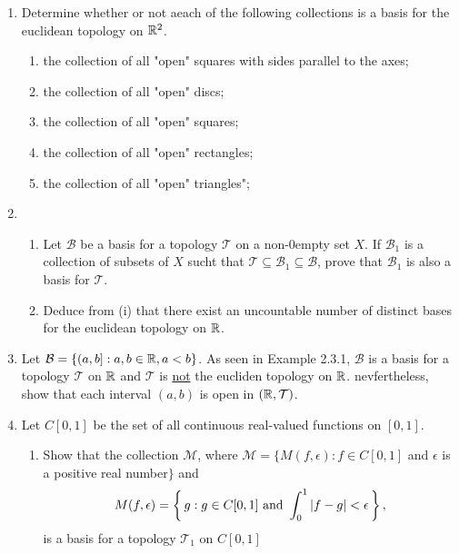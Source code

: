 \documentclass[10pt,a4paper]{report}
\newcommand{\BB}{\mathcal{B}}
\newcommand{\TT}{\mathcal{T}}
\newcommand{\MM}{\mathcal{M}}
\begin{document}
\begin{enumerate}

\item Determine whether or not aeach of the following collections is a basis for the euclidean topology on $\mathbb{R}^2$.

\begin{enumerate}[label=(\roman*)]

	\item the collection of all "open" squares with sides parallel to the axes;
	
	\item the collection of all "open" discs;
	
	\item the collection of all "open" squares;
	
	\item the collection of all "open" rectangles;
	
	\item the collection of all "open" triangles";
	
\end{enumerate}

\item \begin{enumerate}[label=(\roman*)]

	\item Let $\BB$ be a basis for a topology $\TT$ on a non-0empty set $X$.  If $\BB_1$ is a collection of subsets of $X$ sucht that $\TT \subseteq \BB_1 \subseteq \BB$, prove that $\BB_1$ is also a basis for $\TT$.
	
	\item Deduce from (i) that there exist an uncountable number of distinct bases for the euclidean topology on $\mathbb{R}$.

\end{enumerate}

\item Let $\BB = \{(a,b]:a,b\in \R, a < b\}$.  As seen in Example 2.3.1, $\BB$ is a basis for a topology $\TT$ on $\mathbb{R}$ and $\TT$ is \underline{not} the eucliden topology on $\mathbb{R}$.  nevfertheless, show that each interval $(a,b)$ is open in $(\R, \TT)$.

\item Let $C[0,1]$ be the set of all continuous real-valued functions on $[0,1]$.

\begin{enumerate}[label=(\roman*)]

	\item Show that the collection $\MM$, where $\MM = \{M(f,\epsilon):f \in C[0,1]$ and $\epsilon$ is a positive real number$\}$ and \[M(f,\epsilon) = \left \{\, g:g \in C[0,1]\text{ and }\int_0^1|f-g|< \epsilon \,\right \},\] is a basis for a topology $\TT_1$ on $C[0,1]$
	

\end{enumerate}
\end{enumerate}
\end{document}
